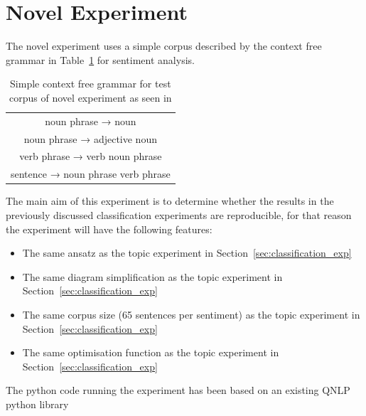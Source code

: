 \documentclass[a4paper,twocolumn,11pt]{quantumarticle}
\begin{document}
    \section{Novel Experiment}\label{sec:novel_exp}
    The novel experiment uses a simple corpus described by the context free grammar in Table~\ref{tab:cfg}
    for sentiment analysis.
    \begin{table}[h!]
        \centering
        \begin{tabular}{|| c ||}
            \hline
            noun phrase → noun \\
            noun phrase → adjective noun \\
            verb phrase → verb noun phrase \\
            sentence → noun phrase verb phrase \\
            \hline
        \end{tabular}
        \caption{Simple context free grammar for test corpus of novel experiment as seen in\cite{qnlp_in_prac}}
        \label{tab:cfg}
    \end{table}
    The main aim of this experiment is to determine whether the results in the previously discussed classification
    experiments are reproducible, for that reason the experiment will have the following features:
    \begin{itemize}
        \item The same ansatz as the topic experiment in Section~\ref{sec:classification_exp}
        \item The same diagram simplification as the topic experiment in Section~\ref{sec:classification_exp}
        \item The same corpus size (65 sentences per sentiment) as the topic experiment in Section~\ref{sec:classification_exp}
        \item The same optimisation function as the topic experiment in Section~\ref{sec:classification_exp}
    \end{itemize}
    The python code running the experiment has been based on an existing QNLP python library\cite{python-lib}
\end{document}

